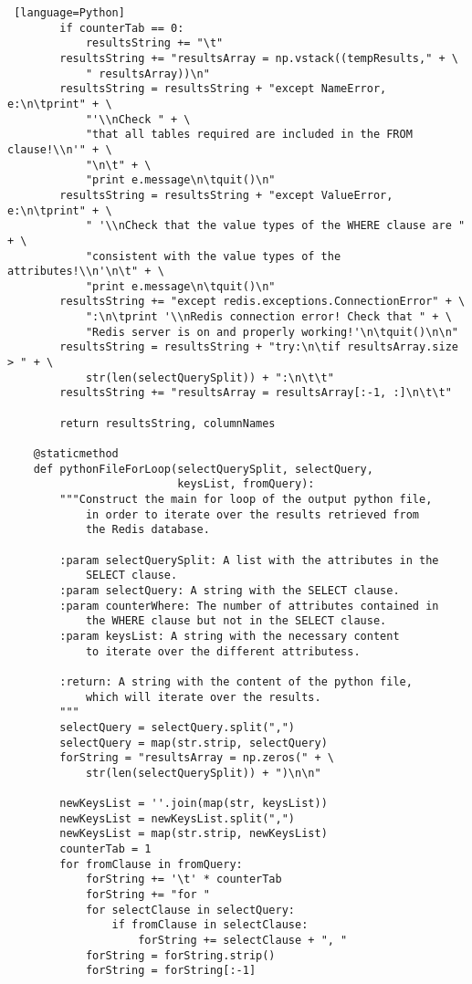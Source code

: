 \documentclass[11pt]{article}
\begin{document}
\begin{lstlisting} [language=Python]
        if counterTab == 0:
            resultsString += "\t"
        resultsString += "resultsArray = np.vstack((tempResults," + \
            " resultsArray))\n"
        resultsString = resultsString + "except NameError, e:\n\tprint" + \
            "'\\nCheck " + \
            "that all tables required are included in the FROM clause!\\n'" + \
            "\n\t" + \
            "print e.message\n\tquit()\n"
        resultsString = resultsString + "except ValueError, e:\n\tprint" + \
            " '\\nCheck that the value types of the WHERE clause are " + \
            "consistent with the value types of the attributes!\\n'\n\t" + \
            "print e.message\n\tquit()\n"
        resultsString += "except redis.exceptions.ConnectionError" + \
            ":\n\tprint '\\nRedis connection error! Check that " + \
            "Redis server is on and properly working!'\n\tquit()\n\n"
        resultsString = resultsString + "try:\n\tif resultsArray.size > " + \
            str(len(selectQuerySplit)) + ":\n\t\t"
        resultsString += "resultsArray = resultsArray[:-1, :]\n\t\t"

        return resultsString, columnNames

    @staticmethod
    def pythonFileForLoop(selectQuerySplit, selectQuery,
                          keysList, fromQuery):
        """Construct the main for loop of the output python file,
            in order to iterate over the results retrieved from
            the Redis database.

        :param selectQuerySplit: A list with the attributes in the
            SELECT clause.
        :param selectQuery: A string with the SELECT clause.
        :param counterWhere: The number of attributes contained in
            the WHERE clause but not in the SELECT clause.
        :param keysList: A string with the necessary content
            to iterate over the different attributess.

        :return: A string with the content of the python file,
            which will iterate over the results.
        """
        selectQuery = selectQuery.split(",")
        selectQuery = map(str.strip, selectQuery)
        forString = "resultsArray = np.zeros(" + \
            str(len(selectQuerySplit)) + ")\n\n"

        newKeysList = ''.join(map(str, keysList))
        newKeysList = newKeysList.split(",")
        newKeysList = map(str.strip, newKeysList)
        counterTab = 1
        for fromClause in fromQuery:
            forString += '\t' * counterTab
            forString += "for "
            for selectClause in selectQuery:
                if fromClause in selectClause:
                    forString += selectClause + ", "
            forString = forString.strip()
            forString = forString[:-1]


\end{lstlisting}
\end{document}
